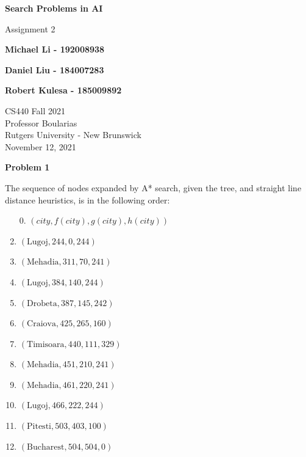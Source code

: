 \documentclass[11pt]{article}
\begin{document}
    \begin{titlepage}
        \begin{center}
            \vspace{1cm}

            \Huge
            \textbf{Search Problems in AI}

            \vspace{0.5cm}
            \LARGE
            Assignment 2

            \vspace{1cm}

            \textbf{Michael Li - 192008938}

            \textbf{Daniel Liu - 184007283}

            \textbf{Robert Kulesa - 185009892}


            \vfill


            \vspace{0.8cm}

            \Large
            CS440 Fall 2021\\
            Professor Boularias\\
            Rutgers University - New Brunswick\\
            November 12, 2021

        \end{center}
    \end{titlepage}

    \begin{center}
        \Large
        \textbf{Problem 1}
    \end{center}
    \normalsize
    The sequence of nodes expanded by A* search, given the tree,
    and straight line distance heuristics, is in the following order:
    \begin{enumerate}
        \item[0.] $\left(city, f(city), g(city), h(city)\right)$
        \item $\left(\text{Lugoj}, 244, 0, 244\right)$
        \item $\left(\text{Mehadia}, 311, 70, 241\right)$
        \item $\left(\text{Lugoj}, 384, 140, 244\right)$
        \item $\left(\text{Drobeta}, 387, 145, 242\right)$
        \item $\left(\text{Craiova}, 425, 265, 160\right)$
        \item $\left(\text{Timisoara}, 440, 111, 329\right)$
        \item $\left(\text{Mehadia}, 451, 210, 241\right)$
        \item $\left(\text{Mehadia}, 461, 220, 241\right)$
        \item $\left(\text{Lugoj}, 466, 222, 244\right)$
        \item $\left(\text{Pitesti}, 503, 403, 100\right)$
        \item $\left(\text{Bucharest}, 504, 504, 0\right)$
    \end{enumerate}
\end{document}
